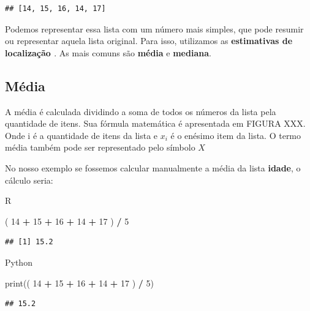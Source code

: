 \documentclass[
]{book}
\newenvironment{Shaded}{\begin{snugshade}}{\end{snugshade}}
\newcommand{\BuiltInTok}[1]{#1}
\newcommand{\DecValTok}[1]{\textcolor[rgb]{0.00,0.00,0.81}{#1}}
\newcommand{\NormalTok}[1]{#1}
\newcommand{\OperatorTok}[1]{\textcolor[rgb]{0.81,0.36,0.00}{\textbf{#1}}}
\newcommand{\SpecialCharTok}[1]{\textcolor[rgb]{0.81,0.36,0.00}{\textbf{#1}}}
\begin{document}
\begin{verbatim}
## [14, 15, 16, 14, 17]
\end{verbatim}

Podemos representar essa lista com um número mais simples, que pode resumir ou representar aquela lista original. Para isso, utilizamos as \textbf{estimativas de localização \citep{bruce2020practical}}. As mais comuns são \textbf{média} e \textbf{mediana}.

\hypertarget{muxe9dia}{%
\subsection{Média}\label{muxe9dia}}

A média é calculada dividindo a soma de todos os números da lista pela quantidade de itens. Sua fórmula matemática é apresentada em FIGURA XXX. Onde i é a quantidade de itens da lista e \(x_i\) é o enésimo item da lista. O termo média também pode ser representado pelo símbolo \(X\)

No nosso exemplo se fossemos calcular manualmente a média da lista \textbf{idade}, o cálculo seria:

R

\begin{Shaded}
\begin{Highlighting}[]
\NormalTok{( }\DecValTok{14} \SpecialCharTok{+} \DecValTok{15} \SpecialCharTok{+} \DecValTok{16} \SpecialCharTok{+} \DecValTok{14} \SpecialCharTok{+} \DecValTok{17}\NormalTok{ ) }\SpecialCharTok{/} \DecValTok{5}
\end{Highlighting}
\end{Shaded}

\begin{verbatim}
## [1] 15.2
\end{verbatim}

Python

\begin{Shaded}
\begin{Highlighting}[]
\BuiltInTok{print}\NormalTok{(( }\DecValTok{14} \OperatorTok{+} \DecValTok{15} \OperatorTok{+} \DecValTok{16} \OperatorTok{+} \DecValTok{14} \OperatorTok{+} \DecValTok{17}\NormalTok{ ) }\OperatorTok{/} \DecValTok{5}\NormalTok{)}
\end{Highlighting}
\end{Shaded}

\begin{verbatim}
## 15.2
\end{verbatim}
\end{document}
